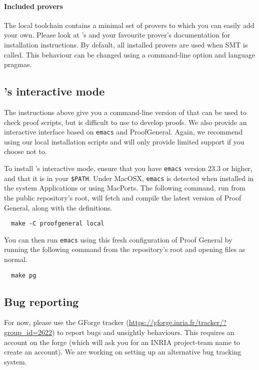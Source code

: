 \paragraph{Included provers}
The local toolchain contains a minimal set of provers to which you can easily
add your own. Please look at \WhyThree's and your favourite prover's
documentation for installation instructions. By default, all installed provers
are used when SMT is called. This behaviour can be changed using a command-line
option and language pragmas.

\subsection{\EasyCrypt's interactive mode}
The instructions above give you a command-line version of \EasyCrypt that can be
used to check proof scripts, but is difficult to use to develop proofs. We also
provide an interactive interface based on \texttt{emacs} and ProofGeneral.
Again, we recommend using our local installation scripts and will only provide
limited support if you choose not to.

To install \EasyCrypt's interactive mode, ensure that you have \texttt{emacs}
version 23.3 or higher, and that it is in your \texttt{\$PATH}. Under MacOSX,
\texttt{emacs} is detected when installed in the system Applications or using
MacPorts. The following command, run from the public repository's root, will
fetch and compile the latest version of Proof General, along with the \EasyCrypt
definitions.
\begin{verbatim}
  make -C proofgeneral local
\end{verbatim}
You can then run \texttt{emacs} using this fresh configuration of Proof General
by running the following command from the repository's root and opening files as
normal.
\begin{verbatim}
  make pg
\end{verbatim}

\subsection{Bug reporting}
For now, please use the GForge tracker
(\url{https://gforge.inria.fr/tracker/?group_id=2622}) to report bugs and
unsightly behaviours. This requires an account on the forge (which will ask you
for an INRIA project-team name %
to create an account). We are working on setting up an alternative bug tracking
system.

